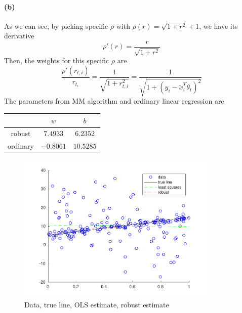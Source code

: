 \documentclass[12pt]{article}
\begin{document}
\paragraph{(b)}
As we can see, by picking specific \(\rho\) with \(\rho(r)=\sqrt{1+r^2}+1\), we have its derivative
\[ \rho'(r)=\frac{r}{\sqrt{1+r^2}} \]
Then, the weights for this specific \(\rho\) are
\[ \frac{\rho'(r_{t,i})}{r_{t_i}}=\frac{1}{\sqrt{1+r_{t,i}^2}}=\frac{1}{\sqrt{1+\left(y_i-\tilde{x}_i^T\theta_t\right)^2}} \]
The parameters from MM algorithm and ordinary linear regression are
\begin{center}
\begin{tabular}{c|cc}
    & \(w\) & \(b\) \\ \hline
    robust & \(7.4933\) & \(6.2352\) \\ \hline
    ordinary & \(-0.8061\) & \(10.5285\)
\end{tabular}
\end{center}
\begin{figure}[htbp]
    \centering
    \includegraphics[width=0.85\textwidth]{./hw3/problem2/hw3p2.pdf}
    \caption{Data, true line, OLS estimate, robust estimate}
\end{figure}
\inputminted[frame=single,framesep=10pt,linenos,xleftmargin=\parindent]{octave}{./hw3/problem2/Robust_regression.m}
\end{document}
